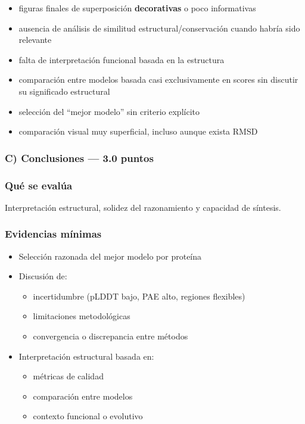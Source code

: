 \documentclass[
  11pt,
  a4paper,
  twoside]{scrreprt}
\providecommand{\tightlist}{%
  \setlength{\itemsep}{0pt}\setlength{\parskip}{0pt}}
\begin{document}
\begin{itemize}
\item
  figuras finales de superposición \textbf{decorativas} o poco
  informativas
\item
  ausencia de análisis de similitud estructural/conservación cuando
  habría sido relevante
\item
  falta de interpretación funcional basada en la estructura
\item
  comparación entre modelos basada casi exclusivamente en scores sin
  discutir su significado estructural
\item
  selección del ``mejor modelo'' sin criterio explícito
\item
  comparación visual muy superficial, incluso aunque exista RMSD
\end{itemize}

\subsubsection{C) Conclusiones --- 3.0
puntos}\label{c-conclusiones-3.0-puntos}

\subsubsection{Qué se evalúa}\label{quuxe9-se-evaluxfaa-2}

Interpretación estructural, solidez del razonamiento y capacidad de
síntesis.

\subsubsection{Evidencias mínimas}\label{evidencias-muxednimas-2}

\begin{itemize}
\item
  Selección razonada del mejor modelo por proteína
\item
  Discusión de:

  \begin{itemize}
  \tightlist
  \item
    incertidumbre (pLDDT bajo, PAE alto, regiones flexibles)
  \item
    limitaciones metodológicas
  \item
    convergencia o discrepancia entre métodos
  \end{itemize}
\item
  Interpretación estructural basada en:

  \begin{itemize}
  \tightlist
  \item
    métricas de calidad
  \item
    comparación entre modelos
  \item
    contexto funcional o evolutivo
  \end{itemize}
\end{itemize}
\end{document}
